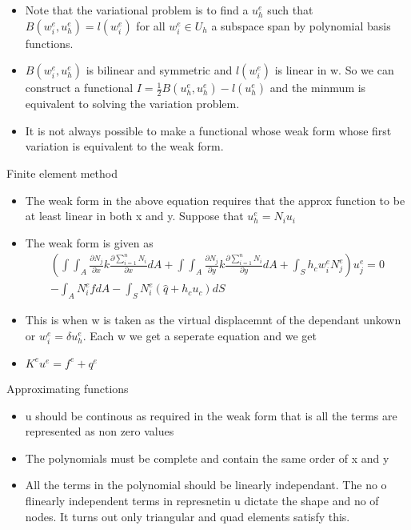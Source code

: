 	\begin{frame}
		\begin{itemize}
			\item Note that the variational problem is to find a $u_h^e$ such that  $B(w_i^e,u_h^e) = l(w_i^e)$ for all $w_i^e \in U_h$ a subspace span by polynomial basis functions.
			\item $B(w_i^e,u_h^e) $ is bilinear and symmetric and $ l(w_i^e)$ is linear in w. So we can construct a functional $I = \frac{1}{2}B(u_h^e,u_h^e) -l(u_h^e)$ and the minmum is equivalent to solving the variation problem.
			\item It is not always possible to make a functional whose weak form  whose first variation is equivalent to the weak form. 
			
		\end{itemize}
	\end{frame}


	\begin{frame}{Finite element method}
		\begin{itemize}
			\item The weak form in the above equation requires that the approx function to be at least linear in both x and y. Suppose that $u_h^e = N_i u_i$
			\item The weak form is given as 
			\begin{equation}
			\begin{aligned}
				\left(\int\int _A \frac{\partial N_j}{\partial x} k \frac{\partial \sum_{i=1}^{n} N_i }{\partial x} dA +
				\int\int _A \frac{\partial N_j}{\partial y} k \frac{\partial \sum_{i=1}^{n} N_i }{\partial y} dA + \int_S h_c w_i^e N_j^e \right)u_j^e= 0 \\
				- \int_A N_i^ef dA - \int_S N_i^e(\hat{q}+h_cu_c)dS
			\end{aligned}
			\end{equation}	
			\item  This is when w is taken as the virtual displacemnt of the dependant unkown or $w_i^e = \delta u_h^e$. Each w we get a seperate equation and we get 
			\item $K^eu^e = f^e + q^e$
		\end{itemize}
	\end{frame}



	\begin{frame}{Approximating functions}
		\begin{itemize}
			\item u should be continous as required in the weak form that is all the terms are represented as non zero values
			\item  The polynomials must be complete and contain the same order of x and y
			\item All the terms in the polynomial should be linearly independant. The no o flinearly independent terms in represnetin u dictate the shape and no of nodes. It turns out only triangular and quad elements satisfy this.
			
		\end{itemize}
	\end{frame}

